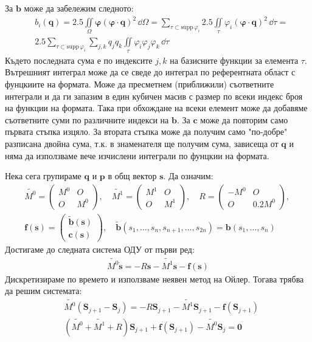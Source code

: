 \documentclass[bulgarian, 12pt]{article}
\begin{document}
\begin{large}
За $\mathbf{b}$ може да забележим следното:
\begin{align*}
  &b_i(\mathbf{q}) = 
  2.5 \iint\limits_{\Omega} \mathbf{\varphi} (\mathbf{\varphi} \cdot \mathbf{q})^2\,\dd\Omega = 
  \sum_{\tau \subset \mathrm{supp} \,\varphi_i } 2.5 \iint\limits_{\tau} \varphi_i (\mathbf{\varphi} \cdot \mathbf{q})^2 \,\dd\tau =\\
  &2.5 \sum_{\tau \subset \mathrm{supp} \,\varphi_i } \sum_{j, k} q_j q_k \iint\limits_{\tau} \varphi_i \varphi_j \varphi_k \,\dd\tau
\end{align*}
Където последната сума е по индексите $j, k$ на базисните функции за елемента $\tau$. 
Вътрешният интеграл може да се сведе до интеграл по референтната област с фунцкиите на формата.
Може да пресметнем (приближили) съответните интеграли и да ги запазим в един кубичен масив с размер по всеки индекс броя на функции на формата.
Така при обхождане на всеки елемент може да добавяме съответните суми по различните индекси на $\mathbf{b}$.
За $\mathbf{c}$ може да повторим само първата стъпка изцяло. 
За втората стъпка може да получим само "по-добре" разписана двойна сума, т.к. в знаменателя ще получим сума, зависеща от $\mathbf{q}$ и няма да използваме вече изчислени интеграли по фунцкии на формата.

Нека сега групираме $\mathbf{q}$ и $\mathbf{p}$ в общ вектор $\mathbf{s}$. Да означим:  
\begin{align*}
  &\tilde{M^0}=\left(\begin{array}{c|c}
    M^0 & O \\ \hline
    O & M^0
  \end{array}\right),\quad
  \tilde{M^1}=\left(\begin{array}{c|c}
    M^1 & O \\ \hline
    O & M^1
  \end{array}\right),\quad
  R=\left(\begin{array}{c|c}
    -M^0 & O \\ \hline
    O & 0.2 M^0
  \end{array}\right),\quad \\
  &\mathbf{f}(\mathbf{s}) = \left(\begin{array}{c}
    \tilde{\mathbf{b}}(\mathbf{s}) \\ \hline
    \mathbf{c}(\mathbf{s})
  \end{array}\right),\quad \tilde{\mathbf{b}}(s_1, \dots, s_n, s_{n+1}, \dots, s_{2 n}) = \mathbf{b}(s_1, \dots, s_n)
\end{align*}
Достигаме до следната система ОДУ от първи ред:
\begin{align*}
  \tilde{M^0}\dot{\mathbf{s}} = -R \mathbf{s} -\tilde{M^1} \mathbf{s} -\mathbf{f}(\mathbf{s})
\end{align*}
Дискретизираме по времето и използваме неявен метод на Ойлер. Тогава трябва да решим системата:
\begin{align*}
  &\tilde{M^0}(\mathbf{S}_{j+1} - \mathbf{S}_j) = -R \mathbf{S}_{j+1} -\tilde{M^1} \mathbf{S}_{j+1} -\mathbf{f}(\mathbf{S}_{j+1}) \\
  &(\tilde{M^0}+\tilde{M^1}+R)\mathbf{S}_{j+1} + \mathbf{f}(\mathbf{S}_{j+1}) - \tilde{M^0}\mathbf{S}_j = \mathbf{0}
\end{align*}
\end{large}
\end{document}
